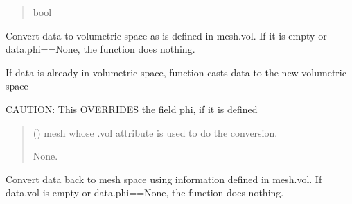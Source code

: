\documentclass[letterpaper,10pt,english]{sphinxmanual}
\begin{document}
\begin{fulllineitems}
\begin{fulllineitems}
\begin{quote}
\begin{description}
\sphinxAtStartPar
bool

\end{description}\end{quote}

\end{fulllineitems}


\begin{fulllineitems}
\label{\detokenize{_autosummary/nirfasterff.base.data.TRMomentsdata:nirfasterff.base.data.TRMomentsdata.togrid}}
\pysigstartsignatures
\pysiglinewithargsret
{}
{}
{}
\pysigstopsignatures
\sphinxAtStartPar
Convert data to volumetric space as is defined in mesh.vol. If it is empty or data.phi==None, the function does nothing.

\sphinxAtStartPar
If data is already in volumetric space, function casts data to the new volumetric space

\sphinxAtStartPar
CAUTION: This OVERRIDES the field phi, if it is defined
\begin{quote}\begin{description}
\sphinxAtStartPar
{} () \textendash{} mesh whose .vol attribute is used to do the conversion.

\sphinxAtStartPar
None.

\end{description}\end{quote}

\end{fulllineitems}


\begin{fulllineitems}
\label{\detokenize{_autosummary/nirfasterff.base.data.TRMomentsdata:nirfasterff.base.data.TRMomentsdata.tomesh}}
\pysigstartsignatures
\pysiglinewithargsret
{}
{}
{}
\pysigstopsignatures
\sphinxAtStartPar
Convert data back to mesh space using information defined in mesh.vol. If data.vol is empty or data.phi==None, the function does nothing.


\end{fulllineitems}
\end{fulllineitems}
\end{document}
